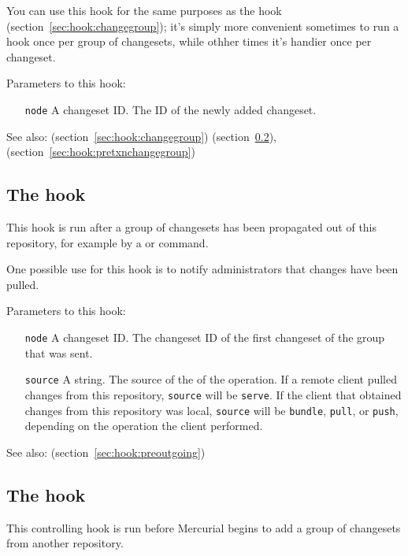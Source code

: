 You can use this hook for the same purposes as the 
hook (section~\ref{sec:hook:changegroup}); it's simply more convenient
sometimes to run a hook once per group of changesets, while othher
times it's handier once per changeset.

Parameters to this hook:
\begin{itemize}
\item[\texttt{node}] A changeset ID.  The ID of the newly added
  changeset.
\end{itemize}

See also:  (section~\ref{sec:hook:changegroup})  (section~\ref{sec:hook:prechangegroup}),  (section~\ref{sec:hook:pretxnchangegroup})

\subsection{The  hook}
\label{sec:hook:outgoing}

This hook is run after a group of changesets has been propagated out
of this repository, for example by a  or 
command.

One possible use for this hook is to notify administrators that
changes have been pulled.

Parameters to this hook:
\begin{itemize}
\item[\texttt{node}] A changeset ID.  The changeset ID of the first
  changeset of the group that was sent.
\item[\texttt{source}] A string.  The source of the of the operation.
  If a remote client pulled changes from this repository,
  \texttt{source} will be \texttt{serve}.  If the client that obtained
  changes from this repository was local, \texttt{source} will be
  \texttt{bundle}, \texttt{pull}, or \texttt{push}, depending on the
  operation the client performed.
\end{itemize}

See also:  (section~\ref{sec:hook:preoutgoing})

\subsection{The  hook}
\label{sec:hook:prechangegroup}

This controlling hook is run before Mercurial begins to add a group of
changesets from another repository.

